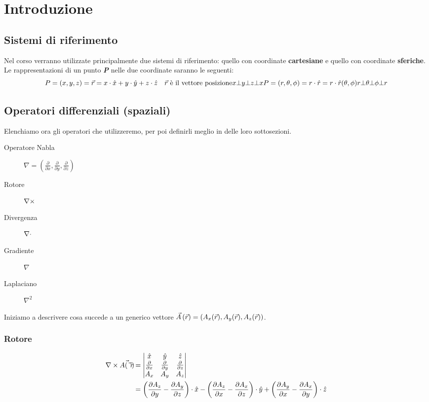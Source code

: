 \chapter{Introduzione}
\section{Sistemi di riferimento}
Nel corso verranno utilizzate principalmente due sistemi di riferimento: quello
con coordinate \textbf{cartesiane} e quello con coordinate \textbf{sferiche}.
Le rappresentazioni di un punto \textit{\textbf{P}} nelle due coordinate saranno le seguenti:
\begin{equation}
  P=(x,y,z) = \vec{r} = x \cdot \hat{x} + y \cdot \hat{y} +z \cdot \hat{z}  \quad \vec{r}\text{ è il vettore posizione} \\
  x \bot y \bot z \bot x \\
  P=(r,\theta,\phi) = r \cdot \hat{r} = r \cdot \hat{r}(\theta,\phi)\\
  r \bot \theta \bot \phi \bot r
  \label{eq:riferimento}
\end{equation}

\section{Operatori differenziali (spaziali)}
Elenchiamo ora gli operatori che utilizzeremo, per poi definirli meglio in delle loro sottosezioni.
\begin{description}
  \item[Operatore Nabla] $ \nabla = \left(\frac{\partial}{\partial x},\frac{\partial}{\partial y},\frac{\partial}{\partial z}\right)$
  \item[Rotore] $\nabla\times$
  \item[Divergenza] $\nabla\cdot$
  \item[Gradiente] $\nabla$
  \item[Laplaciano] $\nabla^2$
\end{description}
Iniziamo a descrivere cosa succede a un generico vettore $\vec{A}\left(\vec{r}\right)=\left(A_x(\vec{r}),A_y(\vec{r}),A_z(\vec{r})\right)$.
\subsection{Rotore}
\begin{equation} \begin{split}
  \nabla\times \vec{A(\vec{r})} &=
  \begin{vmatrix}
    \hat{x} &\hat{y} &\hat{z} \\
    \frac{\partial}{\partial x} & \frac{\partial}{\partial y} & \frac{\partial}{\partial z} \\
    A_x & A_y & A_z
  \end{vmatrix} \\
  &= \left(\frac{\partial A_z}{\partial y} - \frac{\partial A_y}{\partial z}\right)\cdot \hat{x} -
  \left(\frac{\partial A_z}{\partial x} - \frac{\partial A_x}{\partial z}\right)\cdot \hat{y} +
  \left(\frac{\partial A_y}{\partial x} - \frac{\partial A_x}{\partial y}\right)\cdot \hat{z}
\end{split}\end{equation}

